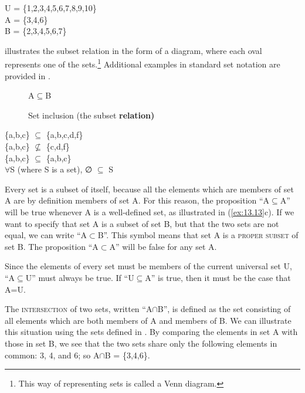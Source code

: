 \ea \label{ex:13.12}
U = \{1,2,3,4,5,6,7,8,9,10\}\\
A = \{3,4,6\}\\
B = \{2,3,4,5,6,7\}
\z


 illustrates the subset relation in the form of a diagram, where each oval represents one of the sets.\footnote{This way of representing sets is called a Venn diagram.} Additional examples in standard set notation are provided in .


\begin{figure}

  \textsf{A}\small{${\subseteq}$}\textsf{B}\\

\caption{\label{fig:13:1} Set inclusion (the subset \textbf{relation)}}
\end{figure}

\ea \label{ex:13.13}
\ea  \{a,b,c\} ${\subseteq}$ \{a,b,c,d,f\}\\
\ex \{a,b,c\} ${\nsubseteq}$ \{c,d,f\} \\
\ex \{a,b,c\} ${\subseteq}$ \{a,b,c\}\\
\ex ${\forall}$S (where S is a set), ∅ ${\subseteq}$ S
                       \z
\z


Every set is a subset of itself, because all the elements which are members of set A are by definition members of set A. For this reason, the proposition “A${\subseteq}$A” will be true whenever A is a well-defined set, as illustrated in (\ref{ex:13.13}c). If we want to specify that set A is a subset of set B, but that the two sets are not equal, we can write “A${\subset}$B”. This symbol means that set A is a \textsc{proper subset} of set B. The proposition “A${\subset}$A” will be false for any set A.



Since the elements of every set must be members of the current universal set U, “A${\subseteq}$U” must always be true. If “U${\subseteq}$A” is true, then it must be the case that A=U.



The \textsc{intersection} of two sets, written “A${\cap}$B”, is defined as the set consisting of all elements which are both members of A and members of B. We can illustrate this situation using the sets defined in . By comparing the elements in set A with those in set B, we see that the two sets share only the following elements in common: 3, 4, and 6; so A${\cap}$B = \{3,4,6\}.


